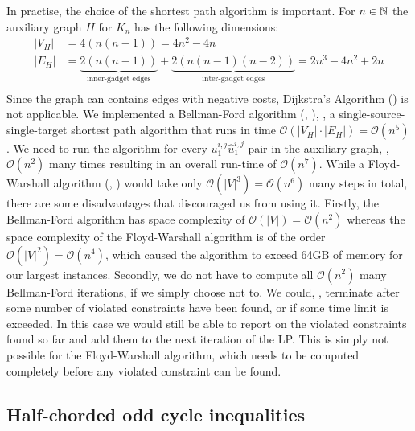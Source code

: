 In practise, the choice of the shortest path algorithm is important.
For $n \in \mathbb{N}$ the auxiliary graph $H$ for $K_{n}$ has the following dimensions:
\begin{align*}
	\lvert V_{H} \rvert &= 4 \left( n(n-1) \right) = 4n^{2} - 4n \\
	\lvert E_{H} \rvert &= \underbrace{2 \left( n(n-1) \right)}_{\text{inner-gadget edges}} + \underbrace{2 \left( n(n-1)(n-2) \right)}_{\text{inter-gadget edges}} = 2n^{3} - 4n^{2} + 2n \\
\end{align*}
Since the graph can contains edges with negative costs, Dijkstra’s Algorithm (\cite{dijkstraNoteTwoProblems1959}) is not applicable.
We implemented a Bellman-Ford algorithm (\cite{bellmanRoutingProblem1958}, \cite{fordNetworkFlowTheory1956}), \ie, a single-source-single-target shortest path algorithm that runs in time $\mathcal{O}(\lvert V_{H} \rvert \cdot \lvert E_{H} \rvert) = \mathcal{O}(n^{5})$.
We need to run the algorithm for every $u_{1}^{i,j}\hat{u}_{1}^{i,j}$-pair in the auxiliary graph, \ie, $\mathcal{O}(n^{2})$ many times resulting in an overall run-time of $\mathcal{O}(n^{7})$.
While a Floyd-Warshall algorithm (\cite{floydAlgorithm97Shortest1962}, \cite{warshallTheoremBooleanMatrices1962}) would take only $\mathcal{O}(\lvert V \rvert^3) = \mathcal{O}(n^{6})$ many steps in total, there are some disadvantages that discouraged us from using it.
Firstly, the Bellman-Ford algorithm has space complexity of $\mathcal{O}(\lvert V \rvert) = \mathcal{O}(n^{2})$ whereas the space complexity of the Floyd-Warshall algorithm is of the order $\mathcal{O}(\lvert V \rvert^{2}) = \mathcal{O}(n^{4})$, which caused the algorithm to exceed 64GB of memory for our largest instances.
Secondly, we do not have to compute all $\mathcal{O}(n^{2})$ many Bellman-Ford iterations, if we simply choose not to.
We could, \eg, terminate after some number of violated constraints have been found, or if some time limit is exceeded.
In this case we would still be able to report on the violated constraints found so far and add them to the next iteration of the LP.
This is simply not possible for the Floyd-Warshall algorithm, which needs to be computed completely before any violated constraint can be found.


\subsection{Half-chorded odd cycle inequalities}\label{subsec:half_chorded_separator}

